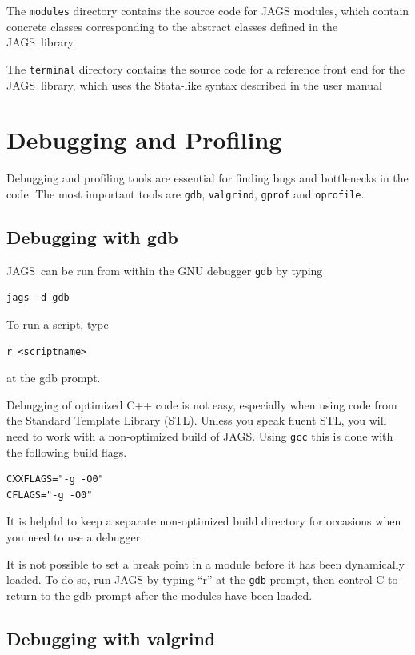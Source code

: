 \documentclass[11pt, a4paper, titlepage]{report}
\newcommand{\JAGS}{\textsf{JAGS}}
\begin{document}
The \texttt{modules} directory contains the source code for JAGS
modules, which contain concrete classes corresponding to the abstract
classes defined in the \JAGS\ library.

The \texttt{terminal} directory contains the source code for a
reference front end for the \JAGS\ library, which uses the
\textsf{Stata}-like syntax described in the user manual

\chapter{Debugging and Profiling}
\label{chapter:debugging}

Debugging and profiling tools are essential for finding bugs and
bottlenecks in the code.  The most important tools are \texttt{gdb},
\texttt{valgrind}, \texttt{gprof} and \texttt{oprofile}.

\section{Debugging with gdb}

\JAGS\ can be run from within the GNU debugger \texttt{gdb} by typing
\begin{verbatim}
jags -d gdb
\end{verbatim}
To run a script, type
\begin{verbatim}
r <scriptname>
\end{verbatim}
at the gdb prompt. 

Debugging of optimized C++ code is not easy, especially when using
code from the Standard Template Library (STL).  Unless you speak
fluent STL, you will need to work with a non-optimized build of
\JAGS. Using \verb+gcc+ this is done with the following build flags.
\begin{verbatim}
CXXFLAGS="-g -O0"
CFLAGS="-g -O0"
\end{verbatim}
It is helpful to keep a separate non-optimized build directory for
occasions when you need to use a debugger.

It is not possible to set a break point in a module before it has
been dynamically loaded. To do so, run JAGS by typing ``r'' at the
\verb+gdb+ prompt, then control-C to return to the gdb prompt after
the modules have been loaded.

\section{Debugging with valgrind}
\end{document}

